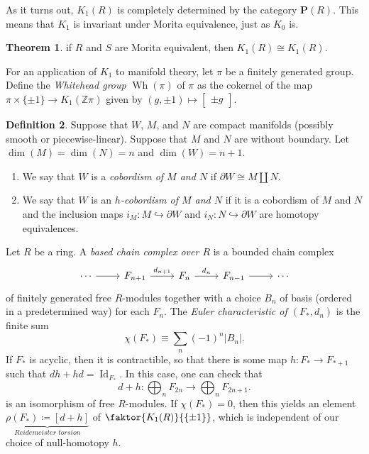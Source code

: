 \documentclass[10pt,letterpaper,cm]{nupset}
\theoremstyle{definition}
\newtheorem{definition}{Definition}[section]
\theoremstyle{theorem}
\newtheorem{theorem}[definition]{Theorem}
\theoremstyle{remark}
\renewcommand{\P}{\mathbf P}
\newcommand{\Z}{\mathbb Z}
\newcommand{\1}{\mathbf{1}}
\newcommand{\0}{\vec 0}
\DeclareMathOperator{\id}{Id}
\DeclareMathOperator{\wh}{Wh}
\begin{document}
\medskip

As it turns out, $K_1(R)$ is completely determined by the category $\P(R)$. This means that $K_1$ is invariant under Morita equivalence, just as $K_0$ is.

\begin{theorem}
 if $R$ and $S$ are Morita equivalent, then $K_1(R) \cong K_1(R)$. 
\end{theorem}

\medskip


For an application of $K_1$ to manifold theory, let $\pi$ be a finitely generated group. Define the \textit{Whitehead group} $\wh(\pi)$ of $\pi$ as the cokernel of the map $\pi \times \{\pm 1\}\to K_1(\Z\pi)$ given by $\left(g, \pm 1\right)\mapsto \begin{bmatrix} \pm g\end{bmatrix}$.

\begin{definition} Suppose that $W$, $M$, and $N$ are compact manifolds (possibly smooth or piecewise-linear). Suppose that $M$ and $N$ are without boundary. Let $\dim(M)=\dim(N) =n$ and $\dim(W) =n+1$.
\begin{enumerate}
\item We say that $W$ is a \textit{cobordism of $M$ and $N$} if $\partial{W}\cong M \coprod N$.
\item We say that $W$ is an \textit{$h$-cobordism of $M$ and $N$} if it is a cobordism of $M$ and $N$ and the inclusion maps $i_M : M \hookrightarrow \partial{W}$ and $i_N: N\hookrightarrow \partial{W}$ are homotopy equivalences.
\end{enumerate}
\end{definition}

Let $R$ be a ring. A \textit{based chain complex over $R$} is a bounded chain complex
\[
\begin{tikzcd}
\cdots \arrow[r] & F_{n+1} \arrow[r, "d_{n+1}"] & F_n \arrow[r, "d_n"] & F_{n-1} \arrow[r] & \cdots
\end{tikzcd}
\] of finitely generated free $R$-modules together with a choice $B_n$ of basis (ordered in a predetermined way) for each $F_n$. The \textit{Euler characteristic of $\left(F_{\ast}, d_n\right)$} is the finite sum
\[
\chi(F_{\ast}) \equiv \sum_{n}({-1})^n\left\lvert{B_n}\right\rvert.
\] If $F_{\ast}$ is acyclic, then it is contractible, so that there is some map $h:F_{\ast} \to F_{\ast +1}$ such that $dh+hd =\id_{F_{\ast}}$. In this case, one can check that
\[
d+h : \bigoplus_nF_{2n} \to \bigoplus_nF_{2n+1}.
\] is an isomorphism of free $R$-modules. If $\chi(F_{\ast}) =0$, then this yields an element $\underbrace{\rho(F_{\ast}) \coloneqq \left[d+h\right]}_{\textit{Reidemeister torsion}}$ of $\faktor{K_1(R)}{\left\{\pm 1\right\}}$, which is independent of our choice of null-homotopy $h$. 
\end{document}
